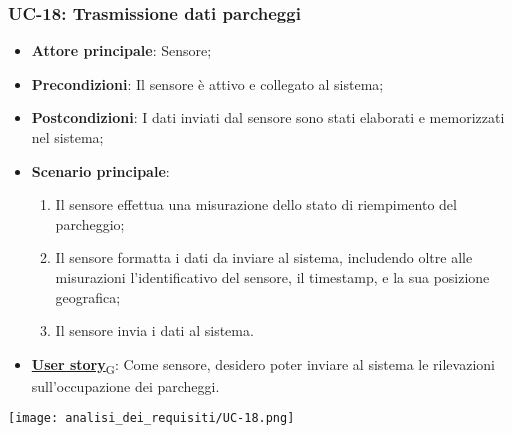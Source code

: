 \subsubsection{UC-18: Trasmissione dati parcheggi}
\begin{itemize}
	\item \textbf{Attore principale}: Sensore;
	\item \textbf{Precondizioni}: Il sensore è attivo e collegato al sistema;
	\item \textbf{Postcondizioni}: I dati inviati dal sensore sono stati elaborati e memorizzati nel sistema;
	\item \textbf{Scenario principale}:
	      \begin{enumerate}
		      \item Il sensore effettua una misurazione dello stato di riempimento del parcheggio;
		      \item Il sensore formatta i dati da inviare al sistema, includendo oltre alle misurazioni l'identificativo del sensore,
		            il timestamp, e la sua posizione geografica;
		      \item Il sensore invia i dati al sistema.
	      \end{enumerate}
	\item \href{https://7last.github.io/docs/rtb/documentazione-interna/glossario\#user-story}{\textbf{User story}\textsubscript{G}}: Come sensore, desidero poter inviare al sistema le rilevazioni sull'occupazione dei parcheggi.
\end{itemize}

\begin{center}
	\texttt{[image: analisi\_dei\_requisiti/UC-18.png]}
\end{center}


